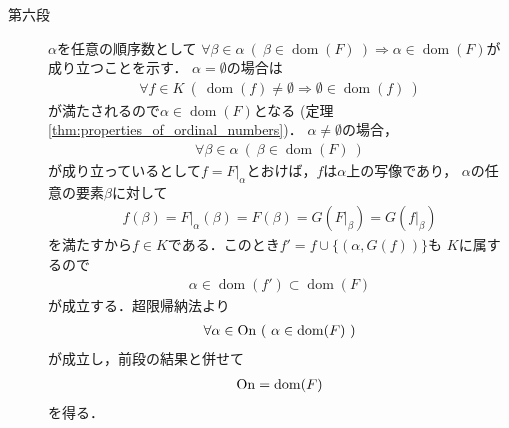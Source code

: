 \begin{prf}
\begin{description}
			\item[第六段] 
				$\alpha$を任意の順序数として
				$\forall \beta \in \alpha\ (\ \beta \in \operatorname{dom}(F)\ )
				\Longrightarrow \alpha \in \operatorname{dom}(F)$が成り立つことを示す．
				$\alpha = \emptyset$の場合は
				\begin{align}
					\forall f \in K\ (\ \operatorname{dom}(f) \neq \emptyset
					\Longrightarrow \emptyset \in \operatorname{dom}(f)\ )
				\end{align}
				が満たされるので$\alpha \in \operatorname{dom}(F)$となる
				(定理\ref{thm:properties_of_ordinal_numbers})．
				$\alpha \neq \emptyset$の場合，
				\begin{align}
					\forall \beta \in \alpha\ (\ \beta \in \operatorname{dom}(F)\ )
				\end{align}
				が成り立っているとして$f = F|_\alpha$とおけば，$f$は$\alpha$上の写像であり，
				$\alpha$の任意の要素$\beta$に対して
				\begin{align}
					f(\beta)
					= F|_\alpha(\beta)
					= F(\beta)
					= G(F|_\beta)
					= G(f|_\beta)
				\end{align}
				を満たすから$f \in K$である．このとき$f' = f \cup \{(\alpha,G(f))\}$も
				$K$に属するので
				\begin{align}	
					\alpha \in \operatorname{dom}(f') \subset
					\operatorname{dom}(F)
				\end{align}
				が成立する．超限帰納法より
				\begin{align}
					\forall \alpha \in \mathrm{On}\ (\ \alpha \in \operatorname{dom}(F)\ )
				\end{align}
				が成立し，前段の結果と併せて
				\begin{align}
					\mathrm{On} = \operatorname{dom}(F)
				\end{align}
				を得る．
				

\end{description}
\end{prf}
